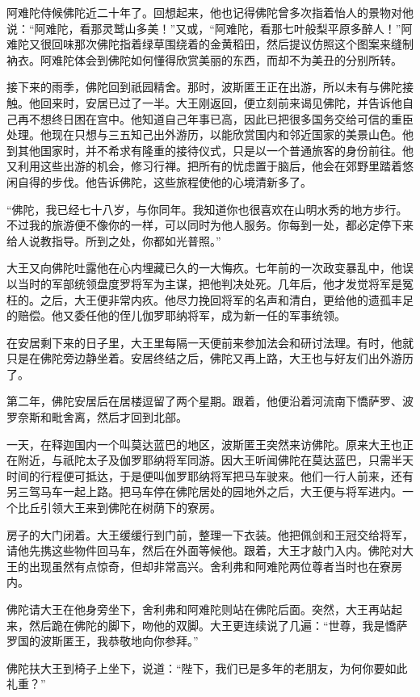 \documentclass[12pt,twoside,openany]{book}
\begin{document}
阿难陀侍候佛陀近二十年了。回想起来，他也记得佛陀曾多次指着怡人的景物对他说：“阿难陀，看那灵鹫山多美！”又或，“阿难陀，看那七叶般梨平原多醉人！”阿难陀又很回味那次佛陀指着绿草围绕着的金黄稻田，然后提议仿照这个图案来缝制衲衣。阿难陀体会到佛陀如何懂得欣赏美丽的东西，而却不为美丑的分别所转。

接下来的雨季，佛陀回到祇园精舍。那时，波斯匿王正在出游，所以未有与佛陀接触。他回来时，安居已过了一半。大王刚返回，便立刻前来谒见佛陀，并告诉他自己再不想终日困在宫中。他知道自己年事已高，因此已把很多国务交给可信的重臣处理。他现在只想与三五知己出外游历，以能欣赏国内和邻近国家的美景山色。他到其他国家时，并不希求有隆重的接待仪式，只是以一个普通旅客的身份前往。他又利用这些出游的机会，修习行禅。把所有的忧虑置于脑后，他会在郊野里踏着悠闲自得的步伐。他告诉佛陀，这些旅程使他的心境清新多了。

“佛陀，我已经七十八岁，与你同年。我知道你也很喜欢在山明水秀的地方步行。不过我的旅游便不像你的一样，可以同时为他人服务。你每到一处，都必定停下来给人说教指导。所到之处，你都如光普照。”

大王又向佛陀吐露他在心内埋藏已久的一大悔疚。七年前的一次政变暴乱中，他误以当时的军部统领盘度罗将军为主谋，把他判决处死。几年后，他才发觉将军是冤枉的。之后，大王便非常内疚。他尽力挽回将军的名声和清白，更给他的遗孤丰足的赔偿。他又委任他的侄儿伽罗耶纳将军，成为新一任的军事统领。

在安居剩下来的日子里，大王里每隔一天便前来参加法会和研讨法理。有时，他就只是在佛陀旁边静坐着。安居终结之后，佛陀又再上路，大王也与好友们出外游历了。

第二年，佛陀安居后在居楼逗留了两个星期。跟着，他便沿着河流南下憍萨罗、波罗奈斯和毗舍离，然后才回到北部。

一天，在释迦国内一个叫莫达蓝巴的地区，波斯匿王突然来访佛陀。原来大王也正在附近，与祇陀太子及伽罗耶纳将军同游。因大王听闻佛陀在莫达蓝巴，只需半天时间的行程便可抵达，于是便叫伽罗耶纳将军把马车驶来。他们一行人前来，还有另三驾马车一起上路。把马车停在佛陀居处的园地外之后，大王便与将军进内。一个比丘引领大王来到佛陀在树荫下的寮房。

房子的大门闭着。大王缓缓行到门前，整理一下衣装。他把佩剑和王冠交给将军，请他先携这些物件回马车，然后在外面等候他。跟着，大王才敲门入内。佛陀对大王的出现虽然有点惊奇，但却非常高兴。舍利弗和阿难陀两位尊者当时也在寮房内。

佛陀请大王在他身旁坐下，舍利弗和阿难陀则站在佛陀后面。突然，大王再站起来，然后跪在佛陀的脚下，吻他的双脚。大王更连续说了几遍：“世尊，我是憍萨罗国的波斯匿王，我恭敬地向你参拜。”

佛陀扶大王到椅子上坐下，说道：“陛下，我们已是多年的老朋友，为何你要如此礼重？”
\end{document}
